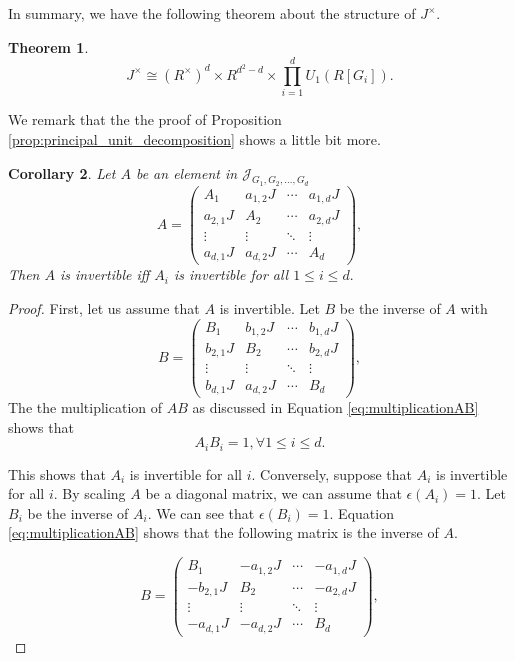 \documentclass[12pt, a4paper]{amsart}
\numberwithin{equation}{section} %
\theoremstyle{plain}
\newtheorem{thm}{Theorem}[section]
\theoremstyle{definition}
\theoremstyle{plain}
\newtheorem{cor}[thm]{Corollary}
\theoremstyle{remark}
\newcommand{\ones}{J}
\newcommand{\sJ}{\mathcal{J}}
\begin{document}
In summary, we have the following theorem about the structure of $J^{\times}.$
\begin{thm}
\[ J^{\times} \cong (R^{\times})^d \times R^{d^2-d} \times \prod_{i=1}^d U_1(R[G_i]) .\]
\end{thm}

We remark that the the proof of Proposition \ref{prop:principal_unit_decomposition} shows a little bit more. 
\begin{cor}
Let $A$ be an element in $\sJ_{G_1, G_2, \ldots, G_d}$ 
\begin{equation*}
A=\left(\begin{array}{c|c|c|c}
A_1 & a_{1,2}\ones & \cdots & a_{1,d}\ones \\
\hline
a_{2,1}\ones & A_2 & \cdots & a_{2,d}\ones \\
\hline
\vdots & \vdots & \ddots & \vdots \\
\hline
a_{d,1}\ones & a_{d,2}\ones & \cdots & A_d
\end{array}\right),
\end{equation*}
Then $A$ is invertible iff $A_i$ is invertible for all $1 \leq i \leq d.$
\end{cor}
\begin{proof}
First, let us assume that $A$ is invertible. Let $B$ be the inverse of $A$ with
\begin{equation*}
B=\left(\begin{array}{c|c|c|c}
B_1 & b_{1,2}\ones & \cdots & b_{1,d}\ones \\
\hline
b_{2,1}\ones & B_2 & \cdots & b_{2,d}\ones \\
\hline
\vdots & \vdots & \ddots & \vdots \\
\hline
b_{d,1}\ones & a_{d,2}\ones & \cdots & B_d
\end{array}\right),
\end{equation*}
The the multiplication of $AB$ as discussed in Equation \ref{eq:multiplicationAB} shows that 
\[ A_iB_i =1 , \forall 1 \leq i \leq d. \]

This shows that $A_i$ is invertible for all $i$. Conversely, suppose that $A_i$ is invertible for all $i$. By scaling $A$ be a diagonal matrix, we can assume that $\epsilon(A_i)=1$.  Let $B_i$ be the inverse of $A_i$. We can see that $\epsilon(B_i)=1.$ Equation \ref{eq:multiplicationAB} shows that the following matrix is the inverse of $A.$

\begin{equation*}
B=\left(\begin{array}{c|c|c|c}
B_1 & -a_{1,2}\ones & \cdots & -a_{1,d}\ones \\
\hline
-b_{2,1}\ones & B_2 & \cdots & -a_{2,d}\ones \\
\hline
\vdots & \vdots & \ddots & \vdots \\
\hline
-a_{d,1}\ones & -a_{d,2}\ones & \cdots & B_d
\end{array}\right),
\end{equation*}
\end{proof}
\end{document}

